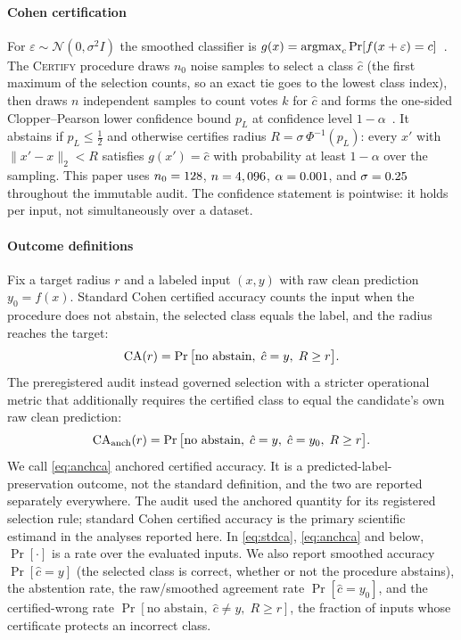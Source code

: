 \paragraph{Cohen certification}
For $\varepsilon\sim\mathcal N(0,\sigma^2 I)$ the smoothed classifier is
$g(x)=\operatorname{argmax}_c \Pr[f(x+\varepsilon)=c]$~\cite{cohen2019smoothing}. The
\textsc{Certify} procedure draws $n_0$ noise samples to select a class
$\hat c$ (the first maximum of the selection counts, so an exact tie goes to
the lowest class index), then draws $n$ independent samples to count votes
$k$ for $\hat c$
and forms the one-sided Clopper--Pearson lower confidence bound $p_L$ at
confidence level $1-\alpha$~\cite{clopper1934}. It abstains if $p_L\le\tfrac12$ and otherwise
certifies radius $R=\sigma\,\Phi^{-1}(p_L)$: every $x'$ with
$\lVert x'-x\rVert_2<R$ satisfies $g(x')=\hat c$ with probability at least
$1-\alpha$ over the sampling. This paper uses $n_0=128$,
$n=4,096$, $\alpha=0.001$, and $\sigma=0.25$ throughout the
immutable audit. The confidence statement is pointwise: it holds per input, not
simultaneously over a dataset.

\paragraph{Outcome definitions}
Fix a target radius $r$ and a labeled input $(x,y)$ with raw clean prediction
$y_0=f(x)$. Standard Cohen certified accuracy counts the input when the
procedure does not abstain, the selected class equals the label, and the radius
reaches the target:
\begin{equation}
\mathrm{CA}(r)=\Pr\big[\text{no abstain},\;\hat c=y,\;R\ge r\big].
\label{eq:stdca}
\end{equation}
The preregistered audit instead governed selection with a stricter operational
metric that additionally requires the certified class to equal the candidate's
own raw clean prediction:
\begin{equation}
\mathrm{CA}_{\mathrm{anch}}(r)=\Pr\big[\text{no abstain},\;\hat c=y,\;\hat c=y_0,\;R\ge r\big].
\label{eq:anchca}
\end{equation}
We call \eqref{eq:anchca} anchored certified accuracy. It is a
predicted-label-preservation outcome, not the standard definition, and the two
are reported separately everywhere. The audit used the anchored quantity for its
registered selection rule; standard Cohen certified accuracy is the primary
scientific estimand in the analyses reported here. In \eqref{eq:stdca}, \eqref{eq:anchca} and
below, $\Pr[\cdot]$ is a rate over the evaluated inputs. We also report smoothed accuracy
$\Pr[\hat c=y]$ (the selected class is correct, whether or not the procedure
abstains), the abstention rate, the raw/smoothed agreement rate
$\Pr[\hat c=y_0]$, and the certified-wrong rate
$\Pr[\text{no abstain},\;\hat c\ne y,\;R\ge r]$, the fraction of inputs whose
certificate protects an incorrect class.

